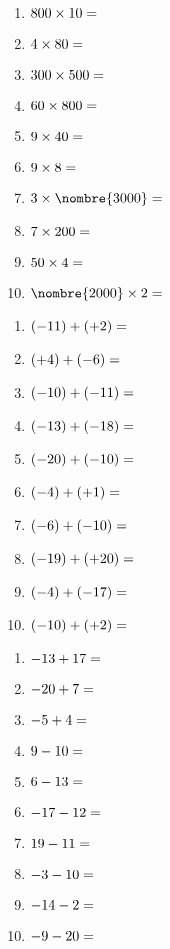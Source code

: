 \documentclass[a4paper,11pt,fleqn]{article}
\begin{document}
\newpage
\setcounter{section}{0}


\begin{multicols}{2}
\begin{enumerate}[itemsep=2em]
	\item $ 800 \times 10 = \dotfill $
	\item $ 4 \times 80 = \dotfill $
	\item $ 300 \times 500 = \dotfill $
	\item $ 60 \times 800 = \dotfill $
	\item $ 9 \times 40 = \dotfill $
	\item $ 9 \times 8 = \dotfill $
	\item $ 3 \times \nombre{3000} = \dotfill $
	\item $ 7 \times 200 = \dotfill $
	\item $ 50 \times 4 = \dotfill $
	\item $ \nombre{2000} \times 2 = \dotfill $
\end{enumerate}
\end{multicols}


\begin{multicols}{2}
\begin{enumerate}[itemsep=2em]
	\item $ (-11) + (+2) = \dotfill $
	\item $ (+4) + (-6) = \dotfill $
	\item $ (-10) + (-11) = \dotfill $
	\item $ (-13) + (-18) = \dotfill $
	\item $ (-20) + (-10) = \dotfill $
	\item $ (-4) + (+1) = \dotfill $
	\item $ (-6) + (-10) = \dotfill $
	\item $ (-19) + (+20) = \dotfill $
	\item $ (-4) + (-17) = \dotfill $
	\item $ (-10) + (+2) = \dotfill $
\end{enumerate}
\end{multicols}


\begin{multicols}{2}
\begin{enumerate}[itemsep=2em]
	\item $ -13+17 = \dotfill $
	\item $ -20+7 = \dotfill $
	\item $ -5+4 = \dotfill $
	\item $ 9-10 = \dotfill $
	\item $ 6-13 = \dotfill $
	\item $ -17-12 = \dotfill $
	\item $ 19-11 = \dotfill $
	\item $ -3-10 = \dotfill $
	\item $ -14-2 = \dotfill $
	\item $ -9-20 = \dotfill $
\end{enumerate}
\end{multicols}
\end{document}
